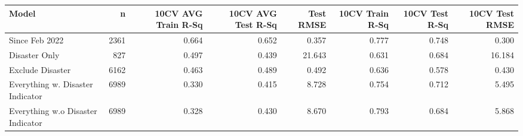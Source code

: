 
\begin{tabular}{l|r|r|r|r|r|r|r}
\hline
Model & n & 10CV AVG Train R-Sq & 10CV AVG Test R-Sq & Test RMSE & 10CV Train R-Sq & 10CV Test R-Sq & 10CV Test RMSE\\
\hline
Since Feb 2022 & 2361 & 0.664 & 0.652 & 0.357 & 0.777 & 0.748 & 0.300\\
\hline
Disaster Only & 827 & 0.497 & 0.439 & 21.643 & 0.631 & 0.684 & 16.184\\
\hline
Exclude Disaster & 6162 & 0.463 & 0.489 & 0.492 & 0.636 & 0.578 & 0.430\\
\hline
Everything w. Disaster Indicator & 6989 & 0.330 & 0.415 & 8.728 & 0.754 & 0.712 & 5.495\\
\hline
Everything w.o Disaster Indicator & 6989 & 0.328 & 0.430 & 8.670 & 0.793 & 0.684 & 5.868\\
\hline
\end{tabular}
